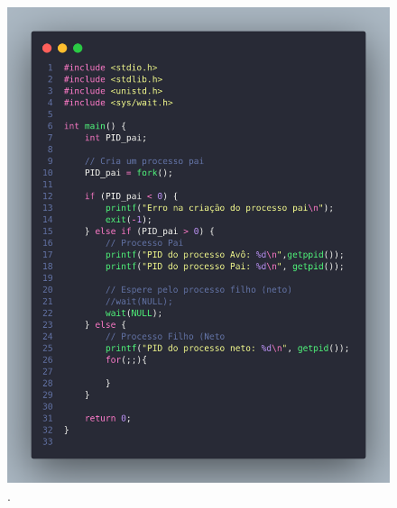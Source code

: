 \documentclass[
	12pt,				%
	openright,			%
	oneside,			%
	a4paper,			%
	chapter=TITLE,		%
	english,			%
	french,				%
	spanish,			%
	brazil				%
	]{abntex2}
\theoremstyle{definition}
\begin{document}
\begin{figure}
    \centering
    \includegraphics[width=1.0\textwidth]{imagens/processos_1.png}
	\caption{.}
	\label{fig:processo1}
\end{figure}
\end{document}
